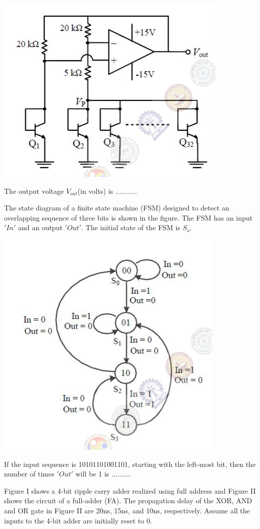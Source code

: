 \includegraphics[scale=0.4]{43}

The output voltage $V_{out}$(in volts) is ...........

\item The state diagram of a finite state machine (FSM) designed to detect an overlapping sequence of three bits is shown in the figure. The FSM has an input $'In'$ and an output $'Out'$. The initial state of the FSM is $S_{o}$.

\includegraphics[scale=0.4]{44}

If the input sequence is 10101101001101, starting with the left-most bit, then the number of times $'Out'$ will be 1 is ..........

\item Figure I shows a 4-bit ripple carry adder realized using full address and Figure II shows the circuit of a full-adder (FA). The propagation delay of the XOR, AND and OR gate in Figure II are 20ns, 15ns, and 10ns, respectively. Assume all the inputs to the 4-bit adder are initially reset to 0.


